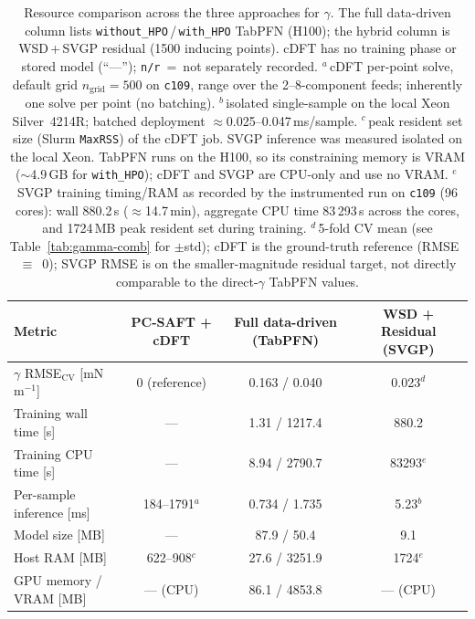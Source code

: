 \documentclass[11pt]{article}
\newcommand{\gmm}{mN\,m$^{-1}$}
\begin{document}
\begin{table}[t]
\centering
\caption{Resource comparison across the three approaches for $\gamma$. The
full data-driven column lists \texttt{without\_HPO}\,/\,\texttt{with\_HPO} TabPFN
(H100); the hybrid column is WSD\,+\,SVGP residual (1500 inducing points). cDFT
has no training phase or stored model (``---''); \texttt{n/r}~=~not separately
recorded.
$^a$\,cDFT per-point solve, default grid $n_\mathrm{grid}=500$ on \texttt{c109},
range over the 2--8-component feeds; inherently one solve per point (no batching).
$^b$\,isolated single-sample on the local Xeon Silver~4214R; batched deployment
$\approx$0.025--0.047\,ms/sample.
$^c$\,peak resident set size (Slurm \texttt{MaxRSS}) of the cDFT job.
SVGP inference was measured isolated on the local Xeon. TabPFN runs on the H100,
so its constraining memory is VRAM ($\sim$4.9\,GB for \texttt{with\_HPO}); cDFT
and SVGP are CPU-only and use no VRAM.
$^e$\,SVGP training timing/RAM as recorded by the instrumented run on
\texttt{c109} (96 cores): wall 880.2\,s ($\approx$14.7\,min), aggregate CPU
time 83\,293\,s across the cores, and 1724\,MB peak resident set during training.
$^d$\,5-fold CV mean (see Table~\ref{tab:gamma-comb} for $\pm$std); cDFT is the
ground-truth reference (RMSE~$\equiv$~0); SVGP RMSE is on the smaller-magnitude
residual target, not directly comparable to the direct-$\gamma$ TabPFN values.}
\label{tab:resource}
\small
\begin{tabular}{lccc}
\toprule
Metric & PC-SAFT + cDFT & Full data-driven (TabPFN) & WSD + Residual (SVGP) \\
\midrule
$\gamma$ RMSE$_\mathrm{CV}$ [\gmm]  & 0 (reference) & 0.163 / 0.040      & 0.023$^d$ \\
\midrule
Training wall time [s]        & ---           & 1.31 / 1217.4      & 880.2 \\
Training CPU time [s]         & ---           & 8.94 / 2790.7      & 83293$^e$ \\
Per-sample inference [ms]     & 184--1791$^a$ & 0.734 / 1.735      & 5.23$^b$ \\
Model size [MB]               & ---           & 87.9 / 50.4        & 9.1 \\
Host RAM [MB]                 & 622--908$^c$  & 27.6 / 3251.9      & 1724$^e$ \\
GPU memory / VRAM [MB]        & --- (CPU)     & 86.1 / 4853.8      & --- (CPU) \\
\bottomrule
\end{tabular}
\end{table}
\end{document}

